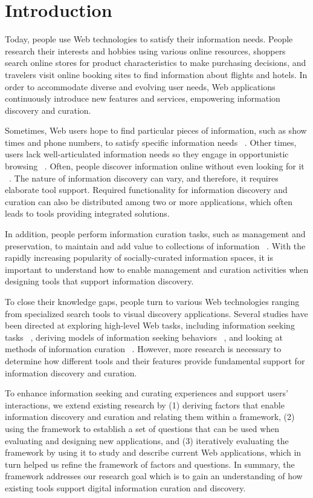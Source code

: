 \chapter{Introduction}
\label{chapter:chapter_related_work}

Today, people use Web technologies to satisfy their information needs. People research their interests and hobbies using various online resources, shoppers search online stores for product characteristics to make purchasing decisions, and travelers visit online booking sites to find information about flights and hotels. In order to accommodate diverse and evolving user needs, Web applications continuously introduce new features and services, empowering information discovery and curation.  

Sometimes, Web users hope to find particular pieces of information, such as show times and phone numbers, to satisfy specific information needs ~\cite{proper}. Other times, users lack well-articulated information needs so they engage in opportunistic browsing ~\cite{lindley}. Often, people discover information online without even looking for it ~\cite{bates1986}. The nature of information discovery can vary, and therefore, it requires elaborate tool support. Required functionality for information discovery and curation can also be distributed among two or more applications, which often leads to tools providing integrated solutions.

In addition, people perform information curation tasks, such as management and preservation, to maintain and add value to collections of information ~\cite{beagrie}. With the rapidly increasing popularity of socially-curated information spaces, it is important to understand how to enable management and curation activities when designing tools that support information discovery.

To close their knowledge gaps, people turn to various Web technologies ranging from specialized search tools to visual discovery applications. Several studies have been directed at exploring high-level Web tasks, including information seeking tasks ~\cite{kellar2006, kellar2007, morrison, sellen}, deriving models of information seeking behaviors ~\cite{choo, ellis1989, ellis1993, ellis1997, bates1986, bates2002}, and looking at methods of information curation ~\cite{beagrie, wittaker}. However, more research is necessary to determine how different tools and their features provide fundamental support for information discovery and curation.

To enhance information seeking and curating experiences and support users' interactions, we extend existing research by (1) deriving factors that enable information discovery and curation and relating them within a framework, (2) using the framework to establish a set of questions that can be used when evaluating and designing new applications, and (3) iteratively evaluating the framework by using it to study and describe current Web applications, which in turn helped us refine the framework of factors and questions. In summary, the framework addresses our research goal which is to gain an understanding of how existing tools support digital information curation and discovery. 

